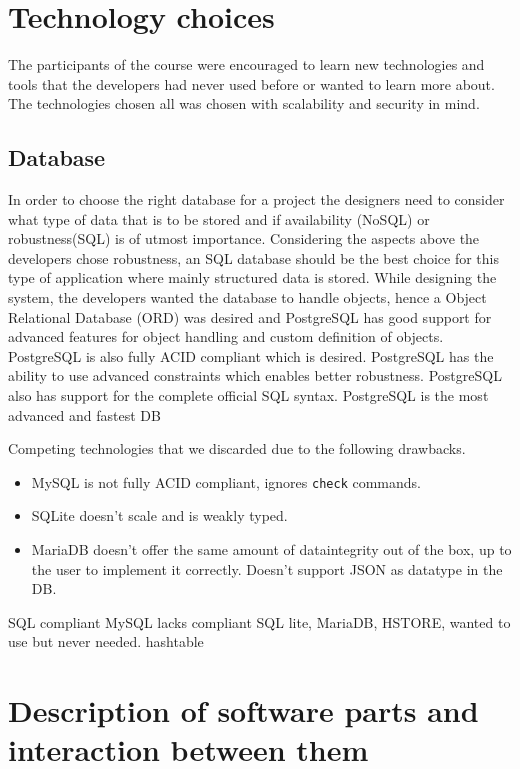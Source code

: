 \documentclass[12pt,a4paper]{report}
\begin{document}
\chapter{Technology choices}
The participants of the course were encouraged to learn new technologies and tools that the developers had never used before or wanted to learn more about. The technologies chosen all was chosen with scalability and security in mind.
\section{Database}
In order to choose the right database for a project the designers need to consider what type of data that is to be stored and if availability (NoSQL) or robustness(SQL) is of utmost importance.
Considering the aspects above the developers chose robustness, an SQL database should be the best choice for this type of application where mainly structured data is stored. 
While designing the system, the developers wanted the database to handle objects, hence a Object Relational Database (ORD) was desired and PostgreSQL has good support for advanced features for object handling and custom definition of objects. PostgreSQL is also fully ACID compliant which is desired. PostgreSQL has the ability to use advanced constraints which enables better robustness. PostgreSQL also has support for the complete official SQL syntax. PostgreSQL is the most advanced and fastest DB

Competing technologies that we discarded due to the following drawbacks.
\begin{itemize}
    \item MySQL is not fully ACID compliant, ignores \texttt{check} commands.
    \item SQLite doesn't scale and is weakly typed.
    \item MariaDB doesn't offer the same amount of dataintegrity out of the box, up to the user to implement it correctly. Doesn't support JSON as datatype in the DB.
\end{itemize}

SQL compliant
MySQL lacks compliant
SQL lite, 
MariaDB, 
HSTORE, wanted to use but never needed. hashtable

\chapter{Description of software parts and interaction between them}

\newpage
\end{document}
